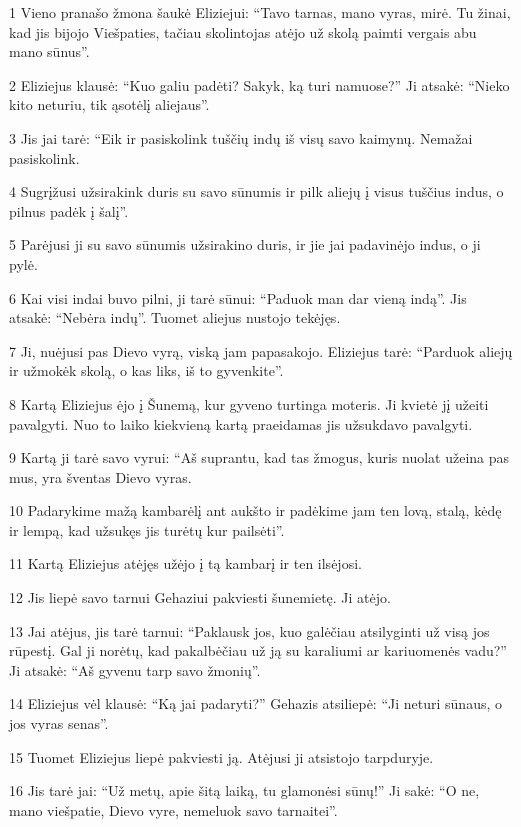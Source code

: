 \par 1 Vieno pranašo žmona šaukė Eliziejui: “Tavo tarnas, mano vyras, mirė. Tu žinai, kad jis bijojo Viešpaties, tačiau skolintojas atėjo už skolą paimti vergais abu mano sūnus”. 
\par 2 Eliziejus klausė: “Kuo galiu padėti? Sakyk, ką turi namuose?” Ji atsakė: “Nieko kito neturiu, tik ąsotėlį aliejaus”. 
\par 3 Jis jai tarė: “Eik ir pasiskolink tuščių indų iš visų savo kaimynų. Nemažai pasiskolink. 
\par 4 Sugrįžusi užsirakink duris su savo sūnumis ir pilk aliejų į visus tuščius indus, o pilnus padėk į šalį”. 
\par 5 Parėjusi ji su savo sūnumis užsirakino duris, ir jie jai padavinėjo indus, o ji pylė. 
\par 6 Kai visi indai buvo pilni, ji tarė sūnui: “Paduok man dar vieną indą”. Jis atsakė: “Nebėra indų”. Tuomet aliejus nustojo tekėjęs. 
\par 7 Ji, nuėjusi pas Dievo vyrą, viską jam papasakojo. Eliziejus tarė: “Parduok aliejų ir užmokėk skolą, o kas liks, iš to gyvenkite”. 
\par 8 Kartą Eliziejus ėjo į Šunemą, kur gyveno turtinga moteris. Ji kvietė jį užeiti pavalgyti. Nuo to laiko kiekvieną kartą praeidamas jis užsukdavo pavalgyti. 
\par 9 Kartą ji tarė savo vyrui: “Aš suprantu, kad tas žmogus, kuris nuolat užeina pas mus, yra šventas Dievo vyras. 
\par 10 Padarykime mažą kambarėlį ant aukšto ir padėkime jam ten lovą, stalą, kėdę ir lempą, kad užsukęs jis turėtų kur pailsėti”. 
\par 11 Kartą Eliziejus atėjęs užėjo į tą kambarį ir ten ilsėjosi. 
\par 12 Jis liepė savo tarnui Gehaziui pakviesti šunemietę. Ji atėjo. 
\par 13 Jai atėjus, jis tarė tarnui: “Paklausk jos, kuo galėčiau atsilyginti už visą jos rūpestį. Gal ji norėtų, kad pakalbėčiau už ją su karaliumi ar kariuomenės vadu?” Ji atsakė: “Aš gyvenu tarp savo žmonių”. 
\par 14 Eliziejus vėl klausė: “Ką jai padaryti?” Gehazis atsiliepė: “Ji neturi sūnaus, o jos vyras senas”. 
\par 15 Tuomet Eliziejus liepė pakviesti ją. Atėjusi ji atsistojo tarpduryje. 
\par 16 Jis tarė jai: “Už metų, apie šitą laiką, tu glamonėsi sūnų!” Ji sakė: “O ne, mano viešpatie, Dievo vyre, nemeluok savo tarnaitei”. 
